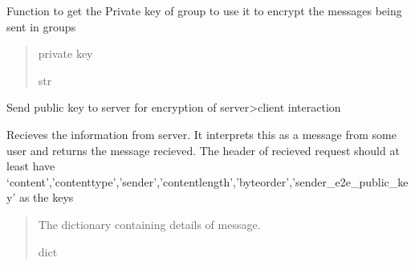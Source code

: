 \documentclass[letterpaper,10pt,english]{sphinxmanual}
\begin{document}
\begin{fulllineitems}
\begin{fulllineitems}
\label{\detokenize{Message:Message.Message._create_group_key}}
\pysigstartsignatures
{}
\pysigstopsignatures
\sphinxAtStartPar
Function to get the Private key of group to use it to encrypt the messages being sent in groups
\begin{quote}\begin{description}
\sphinxAtStartPar
private key

\sphinxAtStartPar
str

\end{description}\end{quote}

\end{fulllineitems}


\begin{fulllineitems}
\label{\detokenize{Message:Message.Message._keyex}}
\pysigstartsignatures
{}
\pysigstopsignatures
\sphinxAtStartPar
Send public key to server for encryption of server\sphinxhyphen{}\textgreater{}client interaction

\end{fulllineitems}


\begin{fulllineitems}
\label{\detokenize{Message:Message.Message._recvmsg}}
\pysigstartsignatures
{}
\pysigstopsignatures
\sphinxAtStartPar
Recieves the information from server. It interprets this as a message from some user and returns the message recieved. The header of recieved request should at least have ‘content’,’content\sphinxhyphen{}type’,’sender’,’content\sphinxhyphen{}length’,’byteorder’,’sender\_e2e\_public\_key’ as the keys
\begin{quote}\begin{description}
\sphinxAtStartPar
The dictionary containing details of message.

\sphinxAtStartPar
dict


\end{description}
\end{quote}
\end{fulllineitems}
\end{fulllineitems}
\end{document}
